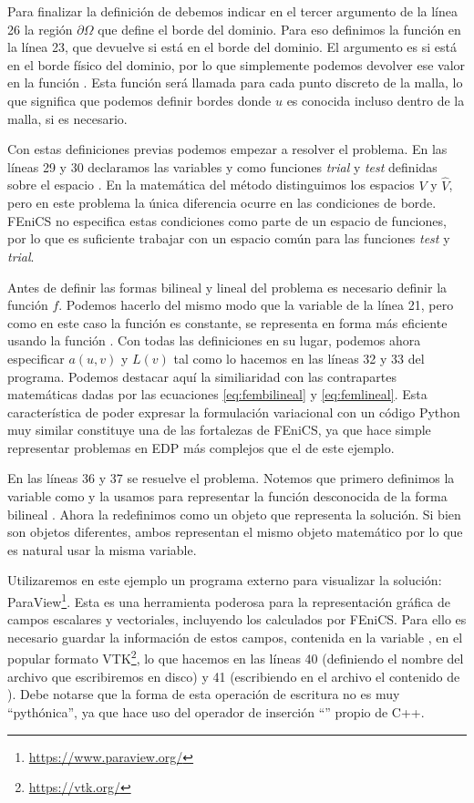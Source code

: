 Para finalizar la definición de  debemos indicar en el tercer argumento de la línea 26 la región $\partial \Omega$ que define el borde del dominio. Para eso definimos la función  en la línea 23, que devuelve  si  está en el borde del dominio. El argumento  es  si  está en el borde físico del dominio, por lo que simplemente podemos devolver ese valor en la función . Esta función será llamada para cada punto discreto de la malla, lo que significa que podemos definir bordes donde $u$ es conocida incluso dentro de la malla, si es necesario.

Con estas definiciones previas podemos empezar a resolver el problema. En las líneas 29 y 30 declaramos las variables  y  como funciones \textit{trial} y \textit{test} definidas sobre el espacio . En la matemática del método distinguimos los espacios $V$ y $\hat{V}$, pero en este problema la única diferencia ocurre en las condiciones de borde. FEniCS no especifica estas condiciones como parte de un espacio de funciones, por lo que es suficiente trabajar con un espacio común  para las funciones \textit{test} y \textit{trial}.

Antes de definir las formas bilineal y lineal del problema es necesario definir la función $f$. Podemos hacerlo del mismo modo que la variable  de la línea 21, pero como en este caso la función es constante, se representa en forma más eficiente usando la función . Con todas las definiciones en su lugar, podemos ahora especificar $a(u, v)$ y $L(v)$ tal como lo hacemos en las líneas 32 y 33 del programa. Podemos destacar aquí la similiaridad con las contrapartes matemáticas dadas por las ecuaciones \eqref{eq:fembilineal} y \eqref{eq:femlineal}. Esta característica de poder expresar la formulación variacional con un código Python muy similar constituye una de las fortalezas de FEniCS, ya que hace simple representar problemas en EDP más complejos que el de este ejemplo. 

En las líneas 36 y 37 se resuelve el problema. Notemos que primero definimos la variable  como  y la usamos para representar la función desconocida de la forma bilineal . Ahora la redefinimos como un objeto  que representa la solución. Si bien son objetos diferentes, ambos representan el mismo objeto matemático por lo que es natural usar la misma variable.

Utilizaremos en este ejemplo un programa externo para visualizar la solución: ParaView\footnote{\href{https://www.paraview.org/}{https://www.paraview.org/}}. Esta es una herramienta poderosa para la representación gráfica de campos escalares y vectoriales, incluyendo los calculados por FEniCS. Para ello es necesario guardar la información de estos campos, contenida en la variable , en el popular formato VTK\footnote{\href{https://vtk.org/}{https://vtk.org/}}, lo que hacemos en las líneas 40 (definiendo el nombre del archivo que escribiremos en disco) y 41 (escribiendo en el archivo el contenido de ). Debe notarse que la forma de esta operación de escritura no es muy ``pythónica'', ya que hace uso del operador de inserción ``\mip{<<}'' propio de C++.

